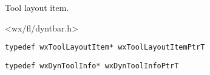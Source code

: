 %
%


\section{}\label{wxtoollayoutitem}


Tool layout item.




<wx/fl/dyntbar.h>


{\small \begin{verbatim}
typedef wxToolLayoutItem* wxToolLayoutItemPtrT
\end{verbatim}}

{\small \begin{verbatim}
typedef wxDynToolInfo* wxDynToolInfoPtrT
\end{verbatim}}

